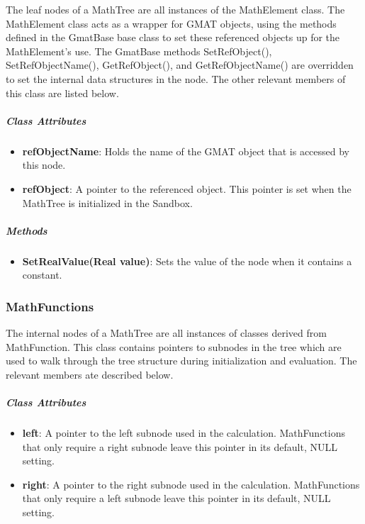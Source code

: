 The leaf nodes of a MathTree are all instances of the MathElement class.  The MathElement class acts
as a wrapper for GMAT objects, using the methods defined in the GmatBase base class to set these
referenced objects up for the MathElement's use.  The GmatBase methods SetRefObject(),
SetRefObjectName(), GetRefObject(), and GetRefObjectName() are overridden to set the internal data
structures in the node.  The other relevant members of this class are listed below.

\subparagraph{\textit{Class Attributes}}
\begin{itemize}
\item \textbf{refObjectName}: Holds the name of the GMAT object that is accessed by this node.
\item \textbf{refObject}: A pointer to the referenced object.  This pointer is set when the MathTree
is initialized in the Sandbox.
\end{itemize}

\subparagraph{\textit{Methods}}
\begin{itemize}
\item \textbf{SetRealValue(Real value)}: Sets the value of the node when it contains a constant.
\end{itemize}

\subsubsection{MathFunctions}

The internal nodes of a MathTree are all instances of classes derived from MathFunction.  This class
contains pointers to subnodes in the tree which are used to walk through the tree structure during
initialization and evaluation.  The relevant members ate described below.

\subparagraph{\textit{Class Attributes}}
\begin{itemize}
\item \textbf{left}: A pointer to the left subnode used in the calculation.  MathFunctions that only
require a right subnode leave this pointer in its default, NULL setting.
\item \textbf{right}: A pointer to the right subnode used in the calculation.  MathFunctions that
only require a left subnode leave this pointer in its default, NULL setting.
\end{itemize}

